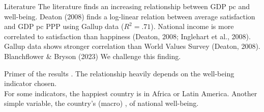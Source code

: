 \documentclass[aspectratio=169,xcolor=dvipsnames, 11pt,mathserif]{beamer}
\begin{document}
\begin{frame}{Literature}
    \ip The literature finds an increasing relationship between GDP pc and well-being.
    \ip Deaton (2008) finds a log-linear relation between average satisfaction and GDP pc PPP using Gallup data ($R^2=.71$).
    \ip National income is more correlated to satisfaction than happiness (Deaton, 2008; Inglehart et al., 2008).
    \ip 
    Gallup data shows stronger correlation than World Values Survey (Deaton, 2008).
    \ip Blanchflower & Bryson (2023)
    \ip We challenge this finding.
    \ee
\end{frame}

\begin{frame}{Primer of the results}
    \bbvsp
    \ip {}.
    \ip The relationship heavily depends on the well-being indicator chosen. \pause \\ For some indicators, the happiest country is in Africa or Latin America.\pause
    \ip Another simple variable, the country's (macro) ,  of national well-being.
    \ee
\end{frame}
\end{document}
